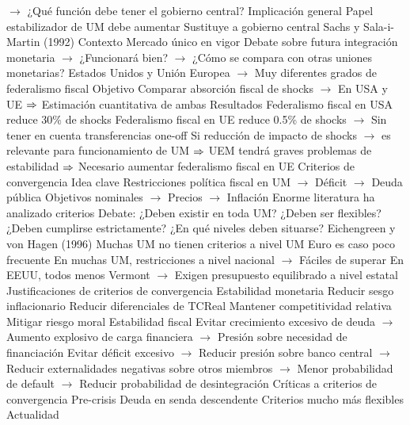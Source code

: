 \documentclass{nuevotema}
\begin{document}
\begin{esquemal}
				\4[] $\to$ ¿Qué función debe tener el gobierno central?
				\4 Implicación general
				\4[] Papel estabilizador de UM debe aumentar
				\4[] Sustituye a gobierno central
			\3 Sachs y Sala-i-Martin (1992)
				\4 Contexto
				\4[] Mercado único en vigor
				\4[] Debate sobre futura integración monetaria
				\4[] $\to$ ¿Funcionará bien?
				\4[] $\to$ ¿Cómo se compara con otras uniones monetarias?
				\4[] Estados Unidos y Unión Europea
				\4[] $\to$ Muy diferentes grados de federalismo fiscal
				\4 Objetivo
				\4[] Comparar absorción fiscal de shocks
				\4[] $\to$ En USA y UE
				\4[] $\Rightarrow$ Estimación cuantitativa de ambas
				\4 Resultados
				\4[] Federalismo fiscal en USA reduce 30\% de shocks
				\4[] Federalismo fiscal en UE reduce 0.5\% de shocks
				\4[] $\to$ Sin tener en cuenta transferencias one-off
				\4[] Si reducción de impacto de shocks
				\4[] $\to$ es relevante para funcionamiento de UM
				\4[] $\Rightarrow$ UEM tendrá graves problemas de estabilidad
				\4[] $\Rightarrow$ Necesario aumentar federalismo fiscal en UE
		\2 Criterios de convergencia
			\3 Idea clave
				\4 Restricciones política fiscal en UM
				\4[] $\to$ Déficit
				\4[] $\to$ Deuda pública
				\4 Objetivos nominales
				\4[] $\to$ Precios
				\4[] $\to$ Inflación
				\4 Enorme literatura ha analizado criterios
				\4 Debate:
				\4[] ¿Deben existir en toda UM?
				\4[] ¿Deben ser flexibles?
				\4[] ¿Deben cumplirse estrictamente?
				\4[] ¿En qué niveles deben situarse?
			\3 Eichengreen y von Hagen (1996)
				\4 Muchas UM no tienen criterios a nivel UM
				\4[] Euro es caso poco frecuente
				\4[] En muchas UM, restricciones a nivel nacional
				\4[] $\to$ Fáciles de superar
				\4[] En EEUU, todos menos Vermont
				\4[] $\to$ Exigen presupuesto equilibrado a nivel estatal
			\3 Justificaciones de criterios de convergencia
				\4 Estabilidad monetaria
				\4[] Reducir sesgo inflacionario
				\4[] Reducir diferenciales de TCReal
				\4[] Mantener competitividad relativa
				\4[] Mitigar riesgo moral
				\4 Estabilidad fiscal
				\4[] Evitar crecimiento excesivo de deuda
				\4[] $\to$ Aumento explosivo de carga financiera
				\4[] $\to$ Presión sobre necesidad de financiación
				\4[] Evitar déficit excesivo
				\4[] $\to$ Reducir presión sobre banco central
				\4[] $\to$ Reducir externalidades negativas sobre otros miembros
				\4[] $\to$ Menor probabilidad de default
				\4[] $\to$ Reducir probabilidad de desintegración
			\3 Críticas a criterios de convergencia
				\4 Pre-crisis
				\4[] Deuda en senda descendente
				\4[] Criterios mucho más flexibles
				\4 Actualidad

\end{esquemal}
\end{document}
